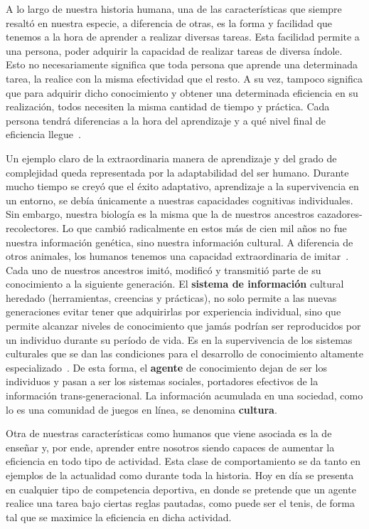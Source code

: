 \documentclass[11pt,twoside,spanish]{report} %
\begin{document}
A lo largo de nuestra historia humana, una de las caracter\'isticas que siempre resalt\'o en nuestra especie, a diferencia de otras, es la forma y facilidad que tenemos a la hora de aprender a realizar diversas tareas.
Esta facilidad permite a una persona, poder adquirir la capacidad de realizar tareas de diversa \'indole.
Esto no necesariamente significa que toda persona que aprende una determinada tarea, la realice con la misma efectividad que el resto.
A su vez, tampoco significa que para adquirir dicho conocimiento y obtener una determinada eficiencia en su realizaci\'on, todos necesiten la misma cantidad de tiempo y pr\'actica.
Cada persona tendr\'a diferencias a la hora del aprendizaje y a qu\'e nivel final de eficiencia llegue~\cite{Beheim2014,Derex2015,Gariepy2014,Glowacki2017}.

Un ejemplo claro de la extraordinaria manera de aprendizaje y del grado de complejidad queda representada por la adaptabilidad del ser humano.
Durante mucho tiempo se crey\'o que el \'exito adaptativo, aprendizaje a la supervivencia en un entorno, se deb\'ia \'unicamente a nuestras capacidades cognitivas individuales.
Sin embargo, nuestra biolog\'ia es la misma que la de nuestros ancestros cazadores-recolectores.
Lo que cambi\'o radicalmente en estos m\'as de cien mil a\~nos no fue nuestra informaci\'on gen\'etica, sino nuestra informaci\'on cultural.
A diferencia de otros animales, los humanos tenemos una capacidad extraordinaria de imitar~\cite{Richerson2010}.
Cada uno de nuestros ancestros imit\'o, modific\'o y transmiti\'o parte de su conocimiento a la siguiente generaci\'on.
El \textbf{sistema de informaci\'on} cultural heredado (herramientas, creencias y pr\'acticas), no solo permite a las nuevas generaciones evitar tener que adquirirlas por experiencia individual, sino que permite alcanzar niveles de conocimiento que jam\'as podr\'ian ser reproducidos por un individuo durante su per\'iodo de vida.
Es en la supervivencia de los sistemas culturales que se dan las condiciones para el desarrollo de conocimiento altamente especializado~\cite{Boyd2011}.
De esta forma, el \textbf{agente} de conocimiento dejan de ser los individuos y pasan a ser los sistemas sociales, portadores efectivos de la informaci\'on trans-generacional.
La informaci\'on acumulada en una sociedad, como lo es una comunidad de juegos en l\'inea, se denomina \textbf{cultura}.

Otra de nuestras caracter\'isticas como humanos que viene asociada es la de ense\~nar y, por ende, aprender entre nosotros siendo capaces de aumentar la eficiencia en todo tipo de actividad.
Esta clase de comportamiento se da tanto en ejemplos de la actualidad como durante toda la historia. 
Hoy en d\'ia se presenta en cualquier tipo de competencia deportiva, en donde se pretende que un agente realice una tarea bajo ciertas reglas pautadas, como puede ser el tenis, de forma tal que se maximice la eficiencia en dicha actividad.
\end{document}
